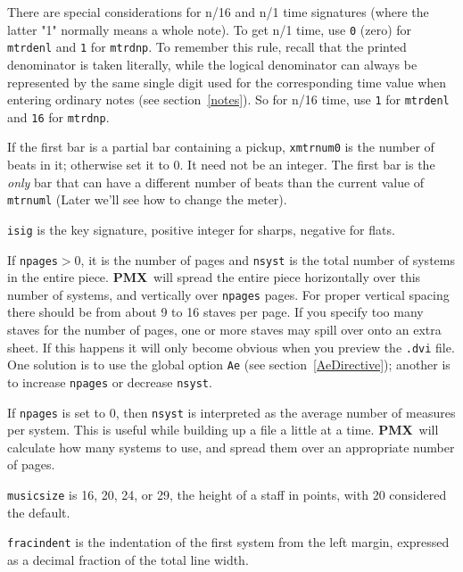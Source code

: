\documentclass[11pt]{article}
\newcommand\PMXX{\textbf{PMX}}
\newcommand\PMX{\PMXX~}
\def\newfrom{2.59}  %
\def\NEW#1{\ifdim#1 pt<\newfrom pt\else%
\marginpar{\fbox{#1}}\fi}
\begin{document}
\medskip

There are special considerations for n/16 and n/1 time signatures (where the 
latter "1" normally means a whole note).  To get
n/1 time, use {\tt 0} (zero) for {\tt mtrdenl} and {\tt 1} for {\tt mtrdnp}.  To 
remember this rule, recall that the printed denominator is taken literally,
while the logical denominator can always be represented
by the same single digit used for the corresponding time value when entering 
ordinary notes (see section~\ref{notes}). So
for n/16 time, use {\tt 1} for {\tt mtrdenl} and {\tt 16} for {\tt mtrdnp}. 

If the first bar is a partial bar containing a pickup, {\tt xmtrnum0} is 
the number of beats in it; otherwise set it to 0.  It need not be an 
integer.  The first bar is the {\it only} bar that can have a different 
number of beats than the current value of {\tt mtrnuml} (Later we'll see how 
to change the meter).

{\tt isig} is the key signature, positive integer for sharps, negative for 
flats.

If {\tt npages}$>$0, it is the number of pages and {\tt nsyst} is the total 
number of systems in the entire piece.  \PMX will spread the entire 
piece horizontally over this number of systems, and vertically over 
{\tt npages} pages.  For proper vertical spacing there should be from 
about 9 to 16 staves per page.  If you specify too many staves for the number
of pages, one or more staves may spill over onto an extra sheet.  If this 
happens it will only become obvious when you preview the {\tt .dvi} file.  
One solution is to use the global option {\tt Ae} 
(see section~\ref{AeDirective}); another is to increase {\tt npages} or 
decrease {\tt nsyst}.

If {\tt npages} is set to 0, then {\tt nsyst} is interpreted as the average 
number of measures per system.  This is useful while building up a 
file a little at a time. \PMX will calculate how many systems to use, and
spread them over an appropriate number of pages.

{\tt musicsize} is 16, 20, 24, or 29, the height of a staff in points, with
20 considered the default\NEW{2.6}.

{\tt fracindent} is the indentation of the first system from the left 
margin, expressed as a decimal fraction of the total line width.
\end{document}
